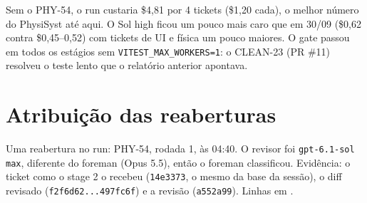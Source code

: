 \documentclass[11pt,a4paper]{article}
\begin{document}
\medskip
{}

\medskip
Sem o PHY-54, o run custaria \$4,81 por 4 tickets (\$1,20 cada), o melhor
número do PhysiSyst até aqui. O Sol high ficou um pouco mais caro que em 30/09
(\$0,62 contra \$0,45--0,52) com tickets de UI e física um pouco maiores. O
gate passou em todos os estágios sem \texttt{VITEST\_MAX\_WORKERS=1}: o
CLEAN-23 (PR \#11) resolveu o teste lento que o relatório anterior apontava.

\section{Atribuição das reaberturas}

Uma reabertura no run: PHY-54, rodada 1, às 04:40. O revisor foi
\texttt{gpt-6.1-sol max}, diferente do foreman (Opus 5.5), então o foreman
classificou. Evidência: o ticket como o stage 2 o recebeu (\texttt{14e3373},
o mesmo da base da sessão), o diff revisado (\texttt{f2f6d62...497fc6f}) e a
revisão (\texttt{a552a99}). Linhas em .
\end{document}
